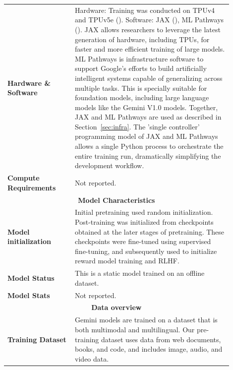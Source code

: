 \begin{longtable}{p{0.27\linewidth}p{0.63\linewidth}}
\midrule
\pagebreak
\midrule
\multicolumn{2}{c}{\textbf{Implementation Frameworks}} \\ \midrule
\textbf{Hardware \& Software} & Hardware: Training was conducted on TPUv4 and TPUv5e (\citealp{jouppi2020tpu, tpuv4}).
\newline
\newline
Software: JAX (\citealp{jax}), ML Pathways (\citealp{2021pathwaysarchitecture}).
\newline
\newline
JAX allows researchers to leverage the latest generation of hardware, including TPUs, for faster and more efficient training of large models.
\newline
\newline
ML Pathways is infrastructure software to support Google’s efforts to build artificially intelligent systems capable of generalizing across multiple tasks. This is specially suitable for foundation models, including large language models like the Gemini V1.0 models.
\newline
\newline
Together, JAX and ML Pathways are used as described in Section~\ref{sec:infra}. The 'single controller' programming model of JAX and ML Pathways allows a single Python process to orchestrate the entire training run, dramatically simplifying the development workflow. \\
\midrule
\textbf{\textbf{Compute Requirements}} & Not reported. \\
\midrule
\multicolumn{2}{c}{\textbf{Model Characteristics}} \\ \midrule
\textbf{\textbf{Model initialization}} & Initial pretraining used random initialization. Post-training was initialized from checkpoints obtained at the later stages of pretraining. These checkpoints were fine-tuned using supervised fine-tuning, and subsequently used to initialize reward model training and RLHF. \\
\midrule
\textbf{\textbf{Model Status}} & This is a static model trained on an offline dataset. \\
\midrule
\textbf{Model Stats} & Not reported. \\
\midrule
\multicolumn{2}{c}{\textbf{Data overview}} \\ \midrule
\textbf{Training Dataset} & Gemini models are trained on a dataset that is both multimodal and multilingual. Our pre-training dataset uses data from web documents, books, and code, and includes image, audio, and video data.
\newline

\end{longtable}

